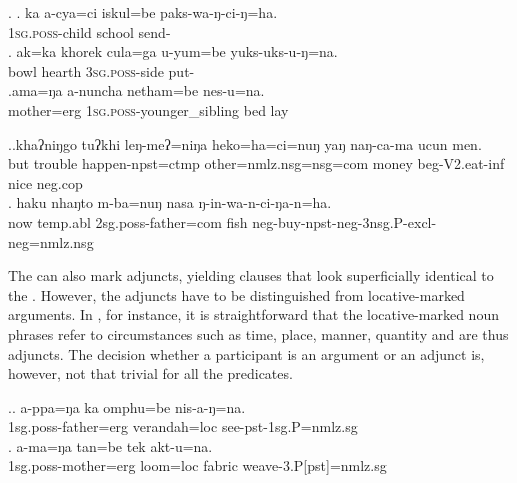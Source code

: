 \ex. \ag. ka a-cya=ci iskul=be paks-wa-ŋ-ci-ŋ=ha.\\
		 \textsc{1sg.poss}-child school send-\\
		\bg. ak=ka khorek cula=ga u-yum=be yuks-uks-u-ŋ=na.\\
	 bowl hearth \textsc{3sg.poss}-side put-\\
\bg.ama=ŋa a-nuncha netham=be nes-u=na.\\
mother{\sc =erg} \textsc{1sg.poss}-younger\_sibling  bed lay\\
	
 
\ex.\ag.khaʔniŋgo tuʔkhi leŋ-meʔ=niŋa  heko=ha=ci=nuŋ  yaŋ  naŋ-ca-ma ucun men.\\
but        trouble happen{\sc [3sg]-npst=ctmp} other{\sc=nmlz.nsg=nsg=com}  money beg{\sc-V2.eat-inf} nice {\sc neg.cop}\\
 
		\bg. haku nhaŋto    m-ba=nuŋ                nasa ŋ-in-wa-n-ci-ŋa-n=ha.\\
		now {\sc temp.abl} {\sc 2sg.poss-}father{\sc =com} fish {\sc neg-}buy{\sc -npst-neg-3nsg.P-excl-neg=nmlz.nsg}\\
		 

The  can also mark adjuncts, yielding clauses that look superficially identical to the . However, the adjuncts have to be distinguished from locative-marked arguments. In \Next, for instance, it is straightforward that the locative-marked noun phrases refer to  circumstances  such as time, place, manner, quantity \citep[108]{Tesniere1959Elements} and are thus adjuncts. The decision whether a participant is an argument or an adjunct is, however, not that trivial for all the predicates.

\ex.\ag. a-ppa=ŋa ka omphu=be nis-a-ŋ=na.\\
{\sc 1sg.poss-}father{\sc =erg}  verandah{\sc =loc} see{\sc -pst-1sg.P=nmlz.sg}\\
\bg. a-ma=ŋa tan=be tek akt-u=na.\\
{\sc 1sg.poss-}mother{\sc =erg} loom{\sc =loc} fabric weave{\sc -3.P[pst]=nmlz.sg}\\
 

